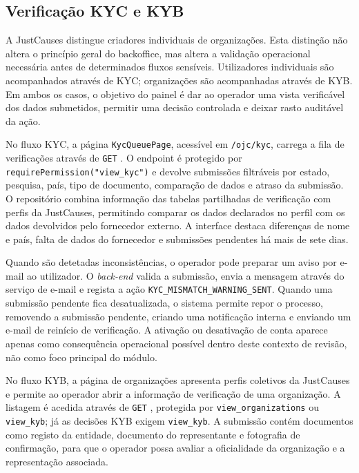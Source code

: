 \subsection{Verificação KYC e KYB}
\label{subsec:impl_kyc_kyb}

A JustCauses distingue criadores individuais de organizações. Esta distinção não altera o princípio geral do backoffice, mas altera a validação operacional necessária antes de determinados fluxos sensíveis. Utilizadores individuais são acompanhados através de \gls{KYC}; organizações são acompanhadas através de \gls{KYB}. Em ambos os casos, o objetivo do painel é dar ao operador uma vista verificável dos dados submetidos, permitir uma decisão controlada e deixar rasto auditável da ação.

No fluxo \gls{KYC}, a página \texttt{KycQueuePage}, acessível em \texttt{/ojc/kyc}, carrega a fila de verificações através de \texttt{GET} . O endpoint é protegido por \texttt{requirePermission("view\_kyc")} e devolve submissões filtráveis por estado, pesquisa, país, tipo de documento, comparação de dados e atraso da submissão. O repositório combina informação das tabelas partilhadas de verificação com perfis da JustCauses, permitindo comparar os dados declarados no perfil com os dados devolvidos pelo fornecedor externo. A interface destaca diferenças de nome e país, falta de dados do fornecedor e submissões pendentes há mais de sete dias.

Quando são detetadas inconsistências, o operador pode preparar um aviso por e-mail ao utilizador. O \textit{back-end} valida a submissão, envia a mensagem através do serviço de e-mail e regista a ação \texttt{KYC\_MISMATCH\_WARNING\_SENT}. Quando uma submissão pendente fica desatualizada, o sistema permite repor o processo, removendo a submissão pendente, criando uma notificação interna e enviando um e-mail de reinício de verificação. A ativação ou desativação de conta aparece apenas como consequência operacional possível dentro deste contexto de revisão, não como foco principal do módulo.

No fluxo \gls{KYB}, a página de organizações apresenta perfis coletivos da JustCauses e permite ao operador abrir a informação de verificação de uma organização. A listagem é acedida através de \texttt{GET} , protegida por \texttt{view\_organizations} ou \texttt{view\_kyb}; já as decisões \gls{KYB} exigem \texttt{view\_kyb}. A submissão contém documentos como registo da entidade, documento do representante e fotografia de confirmação, para que o operador possa avaliar a oficialidade da organização e a representação associada.

